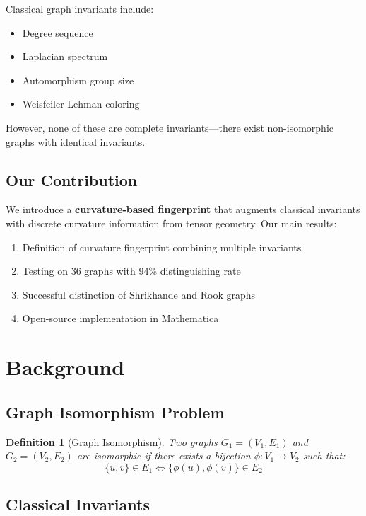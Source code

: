 \documentclass[12pt,a4paper]{article}
\newtheorem{definition}[theorem]{Definition}
\begin{document}
Classical graph invariants include:
\begin{itemize}
  \item Degree sequence
  \item Laplacian spectrum
  \item Automorphism group size
  \item Weisfeiler-Lehman coloring
\end{itemize}

However, none of these are complete invariants—there exist non-isomorphic graphs with identical invariants.

\subsection{Our Contribution}

We introduce a \textbf{curvature-based fingerprint} that augments classical invariants with discrete curvature information from tensor geometry. Our main results:

\begin{enumerate}
  \item Definition of curvature fingerprint combining multiple invariants
  \item Testing on 36 graphs with 94\% distinguishing rate
  \item Successful distinction of Shrikhande and Rook graphs
  \item Open-source implementation in Mathematica
\end{enumerate}

\section{Background}

\subsection{Graph Isomorphism Problem}

\begin{definition}[Graph Isomorphism]
Two graphs $G_1 = (V_1, E_1)$ and $G_2 = (V_2, E_2)$ are \textit{isomorphic} if there exists a bijection $\phi: V_1 \to V_2$ such that:
$$\{u,v\} \in E_1 \iff \{\phi(u), \phi(v)\} \in E_2$$
\end{definition}

\subsection{Classical Invariants}
\end{document}
